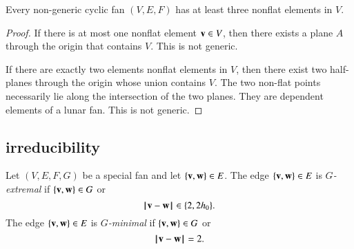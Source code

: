 \begin{lemma}\label{lemma:3-nonflat}
Every non-generic cyclic fan $(V,E,F)$ has at least three nonflat elements in $V$.
\end{lemma}

\begin{proof}
If there is at most one nonflat element ${\mathbf v}\in V$, then there exists a plane $A$ through the origin that contains $V$.  This is not generic.

If there are exactly two elements nonflat elements in $V$, then there exist two half-planes through the origin whose union contains $V$.  The two non-flat points necessarily lie along the intersection of the two planes.  They are dependent elements of a lunar fan.  This is not generic.
\end{proof}

\subsection{irreducibility}

\begin{definition} Let $(V,E,F,G)$ be a special fan and let $\{{\mathbf v},{\mathbf w}\}\in E$.
The edge $\{{\mathbf v},{\mathbf w}\}\in E$ is {\it $G$-extremal} if $\{{\mathbf v},{\mathbf w}\}\in G$ or
$$
{\hskip0.1em|\hskip-0.15em|\hskip0.1em}{\mathbf v} - {\mathbf w}{\hskip0.1em|\hskip-0.15em|\hskip0.1em}\in\{2,2{h_0}\}.
$$
The edge $\{{\mathbf v},{\mathbf w}\}\in E$ is {\it $G$-minimal} if $\{{\mathbf v},{\mathbf w}\}\in G$ or
$$
{\hskip0.1em|\hskip-0.15em|\hskip0.1em}{\mathbf v} - {\mathbf w}{\hskip0.1em|\hskip-0.15em|\hskip0.1em}=2.
$$
\end{definition}

